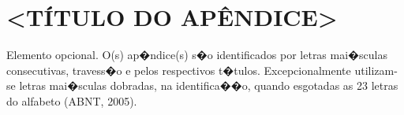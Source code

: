 \chapter{<T\'ITULO DO AP\^ENDICE>}
\label{apend}


Elemento opcional. O(s) ap�ndice(s) s�o identificados por letras mai�sculas consecutivas, travess�o e pelos respectivos t�tulos. Excepcionalmente utilizam-se letras mai�sculas dobradas, na identifica��o, quando esgotadas as 23 letras do alfabeto (ABNT, 2005).
